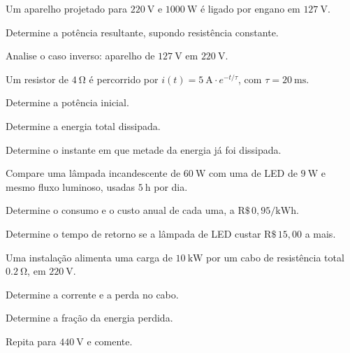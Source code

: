 \begin{questao}[3]{}

Um aparelho projetado para $\SI{220}{\volt}$ e $\SI{1000}{\watt}$ é ligado por
engano em $\SI{127}{\volt}$.
\begin{itensq}
\item Determine a potência resultante, supondo resistência constante.
\item Analise o caso inverso: aparelho de $\SI{127}{\volt}$ em
      $\SI{220}{\volt}$.
\end{itensq}


\end{questao}
\begin{questao}[3]{}

Um resistor de $\SI{4}{\ohm}$ é percorrido por
$i(t)=\SI{5}{\ampere}\cdot e^{-t/\tau}$, com $\tau=\SI{20}{\milli\second}$.
\begin{itensq}
\item Determine a potência inicial.
\item Determine a energia total dissipada.
\item Determine o instante em que metade da energia já foi dissipada.
\end{itensq}


\end{questao}
\begin{questao}[3]{}

Compare uma lâmpada incandescente de $\SI{60}{\watt}$ com uma de LED de
$\SI{9}{\watt}$ e mesmo fluxo luminoso, usadas $\SI{5}{\hour}$ por dia.
\begin{itensq}
\item Determine o consumo e o custo anual de cada uma, a
      $\mathrm{R\$}\,0{,}95/\si{\kilo\watt\hour}$.
\item Determine o tempo de retorno se a lâmpada de LED custar
      $\mathrm{R\$}\,15{,}00$ a mais.
\end{itensq}


\end{questao}
\begin{questao}[3]{}

Uma instalação alimenta uma carga de $\SI{10}{\kilo\watt}$ por um cabo de
resistência total $\SI{0.2}{\ohm}$, em $\SI{220}{\volt}$.
\begin{itensq}
\item Determine a corrente e a perda no cabo.
\item Determine a fração da energia perdida.
\item Repita para $\SI{440}{\volt}$ e comente.
\end{itensq}


\end{questao}

